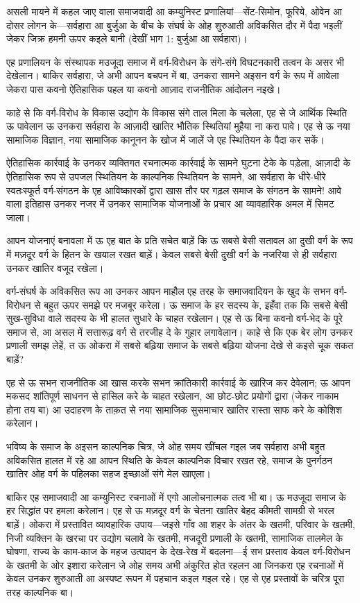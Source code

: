 \documentclass[12pt,a4paper,oneside]{book}
\begin{document}
असली मायने में कहल जाए वाला समाजवादी आ कम्युनिस्ट प्रणालियां—सेंट-सिमोन, फूरिये, ओवेन आ दोसर लोगन के—सर्वहारा आ बुर्जुआ के बीच के संघर्ष के ओह शुरुआती अविकसित दौर में पैदा भइलीं जेकर जिक्र हमनी ऊपर कइले बानी (देखीं भाग 1: बुर्जुआ आ सर्वहारा)।

एह प्रणालियन के संस्थापक मउजूदा समाज में वर्ग-विरोधन के संगे-संगे विघटनकारी तत्वन के असर भी देखेलान। बाकिर सर्वहारा, जे अभी आपन बचपन में बा, उनकरा सामने अइसन वर्ग के रूप में आवेला जेकरा पास कवनो ऐतिहासिक पहल या कवनो आज़ाद राजनीतिक आंदोलन नइखे।

काहे से कि वर्ग-विरोध के विकास उद्योग के विकास संगे ताल मिला के चलेला, एह से जे आर्थिक स्थिति ऊ पावेलान ऊ उनकरा सर्वहारा के आज़ादी खातिर भौतिक स्थितियां मुहैया ना करा पावे। एह से ऊ नया सामाजिक विज्ञान, नया सामाजिक कानूनन के खोज में जालें जे एह स्थितियन के पैदा कर सकें।

ऐतिहासिक कार्रवाई के उनकर व्यक्तिगत रचनात्मक कार्रवाई के सामने घुटना टेके के पड़ेला, आज़ादी के ऐतिहासिक रूप से उपजल स्थितियन के काल्पनिक स्थितियन के सामने, आ सर्वहारा के धीरे-धीरे स्वतःस्फूर्त वर्ग-संगठन के एह आविष्कारकों द्वारा खास तौर पर गढ़ल समाज के संगठन के सामने! आवे वाला इतिहास उनकर नजर में उनकर सामाजिक योजनाओं के प्रचार आ व्यावहारिक अमल में सिमट जाला।

आपन योजनाएं बनावला में ऊ एह बात के प्रति सचेत बाड़ें कि ऊ सबसे बेसी सतावल आ दुखी वर्ग के रूप में मज़दूर वर्ग के हितन के खयाल रखत बाड़ें। केवल सबसे बेसी दुखी वर्ग के नजरिया से ही सर्वहारा उनकर खातिर वजूद रखेला।

वर्ग-संघर्ष के अविकसित रूप आ उनकर आपन माहौल एह तरह के समाजवादियन के खुद के सभन वर्ग-विरोधन से बहुत ऊपर समझे पर मजबूर करेला। ऊ समाज के हर सदस्य के, इहँवा तक कि सबसे बेसी सुख-सुविधा वाले सदस्य के भी हालत सुधारे के चाहत रखेलान। एह से ऊ बिना कवनो वर्ग-भेद के पूरे समाज से, आ असल में सत्तारूढ़ वर्ग से तरजीह दे के गुहार लगावेलान। काहे से कि एक बेर लोग उनकर प्रणाली समझ लेहें, त ऊ ओकरा में सबसे बढ़िया समाज के सबसे बढ़िया योजना देखे से कइसे चूक सकत बाड़ें?

एह से ऊ सभन राजनीतिक आ खास करके सभन क्रांतिकारी कार्रवाई के खारिज कर देवेलान; ऊ आपन मकसद शांतिपूर्ण साधनन से हासिल करे के चाहत रखेलान, आ छोट-छोट प्रयोगों द्वारा (जेकर नाकाम होना तय बा) आ उदाहरण के ताक़त से नया सामाजिक सुसमाचार खातिर रास्ता साफ करे के कोशिश करेलान।

भविष्य के समाज के अइसन काल्पनिक चित्र, जे ओह समय खींचल गइल जब सर्वहारा अभी बहुत अविकसित हालत में रहे आ आपन स्थिति के केवल काल्पनिक विचार रखत रहे, समाज के पुनर्गठन खातिर ओह वर्ग के पहिलका सहज इच्छाओं संगे मेल खाएला।

बाकिर एह समाजवादी आ कम्युनिस्ट रचनाओं में एगो आलोचनात्मक तत्व भी बा। ऊ मउजूदा समाज के हर सिद्धांत पर हमला करेलान। एह से ऊ मज़दूर वर्ग के चेतना खातिर बेहद कीमती सामग्री से भरल बाड़ें। ओकरा में प्रस्तावित व्यावहारिक उपाय—जइसे गाँव आ शहर के अंतर के खतमी, परिवार के खतमी, निजी व्यक्तिन के खरचा पर उद्योग चलावे के खतमी, मजदूरी प्रणाली के खतमी, सामाजिक तालमेल के घोषणा, राज्य के काम-काज के महज उत्पादन के देख-रेख में बदलना—ई सभ प्रस्ताव केवल वर्ग-विरोधन के खतमी के ओर इशारा करेलान जे ओह समय अभी अंकुरित होत रहलन आ जिनकरा एह रचनाओं में केवल उनकर शुरुआती आ अस्पष्ट रूपन में पहचान कइल गइल रहे। एह से एह प्रस्तावों के चरित्र पूरा तरह काल्पनिक बा।
\end{document}
